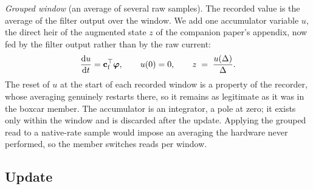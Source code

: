 \documentclass[11pt]{article}
\begin{document}
\emph{Grouped window} (an average of several raw samples). The recorded
value is the average of the filter output over the window. We add one
accumulator variable $u$, the direct heir of the augmented state $z$ of
the companion paper's appendix, now fed by the filter output rather than
by the raw current:
\begin{equation}
  \frac{\mathrm{d}u}{\mathrm{d}t} = \mathbf{c}_{\mathrm{f}}^{\top}\bm{\varphi},
  \qquad u(0) = 0,
  \qquad
  z \;=\; \frac{u(\Delta)}{\Delta}.
  \label{eq:read-grouped}
\end{equation}
The reset of $u$ at the start of each recorded window is a property of the
recorder, whose averaging genuinely restarts there, so it remains as
legitimate as it was in the boxcar member. The accumulator is an
integrator, a pole at zero; it exists only within the window and is
discarded after the update. Applying the grouped read to a native-rate
sample would impose an averaging the hardware never performed, so the
member switches reads per window.

\subsection{Update}
\end{document}
